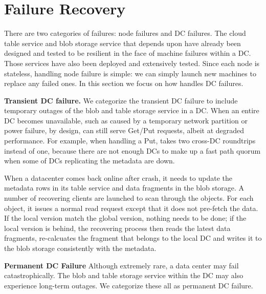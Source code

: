\section{Failure Recovery}

There are two categories of failures: node failures and DC failures.
The cloud table service and blob storage service that {\name} depends upon have already 
been designed and tested to be resilient in the face of machine failures within a DC. 
Those services have also been deployed and extensively tested. 
Since each \name node is stateless, handling node failure is simple: we can
simply launch new machines to replace any failed ones. In this section we focus
on how \name handles DC failures.

{\bf Transient DC failure.}
We categorize the transient DC failure to include temporary outages of the blob
and table storage service in a DC. 
When an entire DC becomes unavailable, such as caused by a
temporary network partition or power failure, by design, {\name} can still
serve Get/Put requests, albeit at degraded performance. 
For example, when handling a Put,
\name takes two cross-DC roundtrips instead of one, because there are not enough
DCs to make up a fast path quorum when some of DCs replicating the metadata
are down. 

When a datacenter comes back online after crash, it needs to update the metadata
rows in its table service and data fragments in the blob storage. A number of
recovering clients are launched to scan through the objects. For each object, it
issues a normal read request except that it does not pre-fetch the data. If the
local version match the global version, nothing needs to be done; if the local
version is behind, the recovering process then reads the latest data fragments,
re-calcuates the fragment that belongs to the local DC and writes it to
the blob storage consistently with the metadata.


{\bf Permanent DC Failure}
Although extremely rare, a data center may fail catastrophically. The blob and
table storage service within the DC may also experience long-term outages. We
categorize these all as permanent DC failure. 


